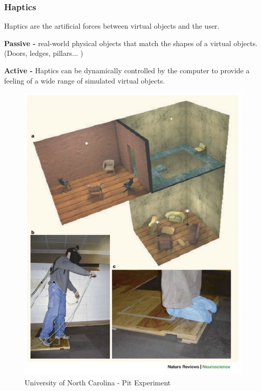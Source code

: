 \begin{frame}
	\frametitle{Haptics}
	Haptics are the artificial forces between virtual objects and the user.
	\vspace{.2in}
	
	\textbf{Passive -}
	real-world physical objects that match the shapes of a virtual objects. (Doors, ledges, pillars... )
	\vspace{.2in}
	
	\textbf{Active -} Haptics can be dynamically controlled by the computer to provide a feeling of a wide range of simulated virtual objects.
	
\end{frame}

\begin{frame}
	\begin{figure}
		\includegraphics[scale=0.25]{assets/thepit.png}
		\caption{University of North Carolina - Pit Experiment}
	\end{figure}
\end{frame}

